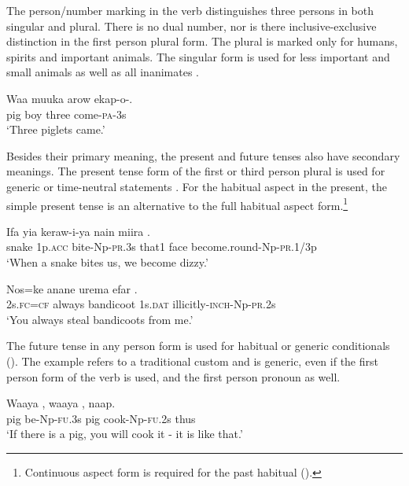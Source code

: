 The person/number marking in the verb distinguishes three persons in both singular and plural. There is no dual number, nor is there inclusive-exclusive distinction in the first person plural form. The plural is marked only for humans, spirits and important animals. The singular form is used for less important and small animals as well as all inanimates .

\ea%
\label{ex:3:x236}
\gll Waa muuka arow ekap-o-. \\
pig boy three come-\textsc{pa}-3s \\
\glt`Three piglets came.'
\z

Besides their primary meaning, the present and future tenses also have secondary meanings. The present tense form of the first or third person plural is used for generic or time-neutral statements . For the habitual aspect in the present, the simple present tense  is an alternative to the full habitual aspect form.\footnote{Continuous aspect form is required for the past habitual ().} 

\ea%
\label{ex:3:x1034}
\gll Ifa yia keraw-i-ya nain miira . \\
snake 1p.\textsc{acc} bite-Np-\textsc{pr}.3s that1 face become.round-Np-\textsc{pr}.1/3p\\
\glt `When a snake bites us, we become dizzy.'
\z

\ea%
\label{ex:3:x1035}
\gll Nos=ke anane urema efar . \\
2s.\textsc{fc}=\textsc{cf} always bandicoot 1s.\textsc{dat} illicitly-\textsc{inch}-Np-\textsc{pr}.2s\\
\glt`You always steal bandicoots from me.'
\z

The future tense in any person form is used for habitual or generic conditionals  (). The example  refers to a traditional custom and is generic, even if the first person form of the verb is used, and the first person pronoun as well.

\ea%
\label{ex:3:x1640}
\gll Waaya , waaya , naap. \\
pig be-Np-\textsc{fu}.3s pig cook-Np-\textsc{fu}.2s thus\\
\glt`If there is a pig, you will cook it - it is like that.'
\z

